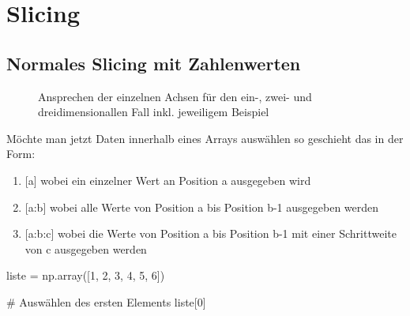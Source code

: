 \documentclass[
  letterpaper,
  DIV=11,
  numbers=noendperiod]{scrreprt}
\newenvironment{Shaded}{\begin{snugshade}}{\end{snugshade}}
\newcommand{\CommentTok}[1]{\textcolor[rgb]{0.37,0.37,0.37}{#1}}
\newcommand{\DecValTok}[1]{\textcolor[rgb]{0.68,0.00,0.00}{#1}}
\newcommand{\NormalTok}[1]{\textcolor[rgb]{0.00,0.23,0.31}{#1}}
\newcommand{\OperatorTok}[1]{\textcolor[rgb]{0.37,0.37,0.37}{#1}}
\providecommand{\tightlist}{%
  \setlength{\itemsep}{0pt}\setlength{\parskip}{0pt}}\usepackage{longtable,booktabs,array}
\begin{document}
\begin{tcolorbox}
\begin{tcolorbox}
\begin{tcolorbox}
\end{tcolorbox}

\end{tcolorbox}

\chapter{Slicing}\label{slicing}

\section{Normales Slicing mit
Zahlenwerten}\label{normales-slicing-mit-zahlenwerten}

\begin{figure}[H]


\caption{\label{fig-slicing}Ansprechen der einzelnen Achsen für den
ein-, zwei- und dreidimensionallen Fall inkl. jeweiligem Beispiel}

\end{figure}%

Möchte man jetzt Daten innerhalb eines Arrays auswählen so geschieht das
in der Form:

\begin{enumerate}
\def\labelenumi{\arabic{enumi}.}
\tightlist
\item
  {[}a{]} wobei ein einzelner Wert an Position a ausgegeben wird
\item
  {[}a:b{]} wobei alle Werte von Position a bis Position b-1 ausgegeben
  werden
\item
  {[}a:b:c{]} wobei die Werte von Position a bis Position b-1 mit einer
  Schrittweite von c ausgegeben werden
\end{enumerate}

\begin{Shaded}
\begin{Highlighting}[]
\NormalTok{liste }\OperatorTok{=}\NormalTok{ np.array([}\DecValTok{1}\NormalTok{, }\DecValTok{2}\NormalTok{, }\DecValTok{3}\NormalTok{, }\DecValTok{4}\NormalTok{, }\DecValTok{5}\NormalTok{, }\DecValTok{6}\NormalTok{])}
\end{Highlighting}
\end{Shaded}

\begin{Shaded}
\begin{Highlighting}[]
\CommentTok{\# Auswählen des ersten Elements}
\NormalTok{liste[}\DecValTok{0}\NormalTok{]}
\end{Highlighting}
\end{Shaded}


\end{tcolorbox}
\end{document}
